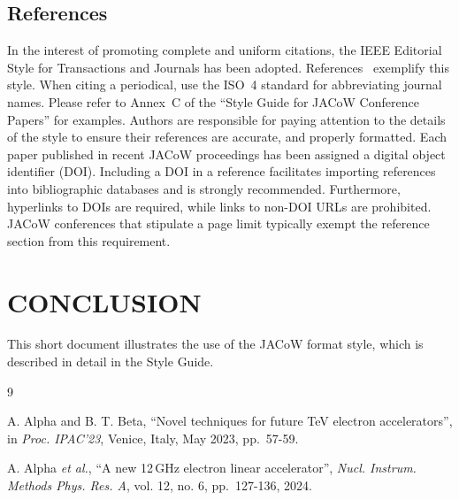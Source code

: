 \documentclass[%
               ]{jacow}
\begin{document}
\subsection{References}

In the interest of promoting complete and uniform citations, 
the IEEE Editorial Style for Transactions and Journals has been adopted. 
References~\cite{ref:jacow-paper, ref:journal-paper} exemplify this style. 
When citing a periodical, use the ISO~4 standard for abbreviating journal names. 
Please refer to Annex~C of the “Style Guide for JACoW Conference Papers” for examples. 
Authors are responsible for paying attention to the details of the style to ensure their references are 
accurate, and properly formatted. 
Each paper published in recent JACoW proceedings has been assigned a digital object identifier (DOI). Including a DOI in a reference facilitates importing references into bibliographic databases and is strongly recommended. 
Furthermore, hyperlinks to DOIs are required, while links to non-DOI URLs are prohibited. 
JACoW conferences that stipulate a page limit typically exempt the reference section from this requirement.

\section{CONCLUSION}

This short document illustrates the use of the JACoW format style, which is described in detail in the Style Guide. 

\begin{thebibliography}{9} 		%
	
		A. Alpha and B. T. Beta, 
		“Novel techniques for future TeV electron accelerators”, 
		in \textit{Proc. IPAC’23}, Venice, Italy, May 2023, pp.~57-59. 
	
		A. Alpha \textit{et al.}, 
		“A new 12\,GHz electron linear accelerator”, 
		\textit{Nucl. Instrum. Methods Phys. Res. A}, vol. 12, no. 6, pp.~127-136, 2024. 
		
\end{thebibliography}
\end{document}
